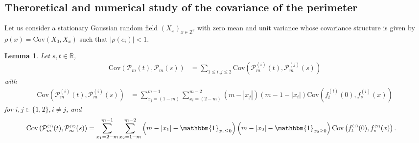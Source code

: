 \documentclass[12pt]{article}
\theoremstyle{Theorem}
\newtheorem{Lemma}[Theorem]{Lemma}
\theoremstyle{definition}
\begin{document}
\subsection{Theroretical and numerical study of the covariance of the perimeter}
Let us consider a stationary Gaussian random field $\left(X_{\scriptscriptstyle x}\right)_{x \in \mathbb{Z}^{2}}$ with zero mean and unit variance whose covariance structure is given by $\rho(x) = \text{Cov}\left(X_{\scriptscriptstyle 0}, X_{\scriptscriptstyle x}\right)$ such that $|\rho(e_i)| < 1$.
\begin{Lemma} 
Let $s, t \in \mathbb{R}$, 
\label{CovLemma}
\begin{align*}
\text{Cov}(\mathcal{P}_{m}(t), \mathcal{P}_{m}(s))  & = \sum_{1\leq i,j\leq 2}\text{Cov}(\mathcal{P}_{m}^{\scriptscriptstyle (i)}(t), \mathcal{P}_{m}^{\scriptscriptstyle (j)}(s)) 
\end{align*} 
with 
\begin{align*}
\text{Cov}\left(\mathcal{P}_{m}^{\scriptscriptstyle (i)}(t),\mathcal{P}_{m}^{\scriptscriptstyle (i)}(s) \right) 
& = \sum_{x_{\scriptscriptstyle j}=\left(1-m\right)}^{m-1}\sum_{x_{\scriptscriptstyle i}=\left(2-m\right)}^{m-2}\left(m -|x_{j}|\right)\left(m - 1- |x_{i}|\right) \text{Cov}\left(f_{t}^{\scriptscriptstyle (i)}(0), f_{s}^{\scriptscriptstyle (i)}(x) \right) 
\end{align*} 
for $i,j \in\{1,2\}, i\neq j$, and 
\begin{align*}
\text{Cov}\left(\mathcal{P}_{m}^{\scriptscriptstyle (1)}(t),\mathcal{P}_{m}^{\scriptscriptstyle (2)}(s) \right) 
& = \sum_{x_1=2-m}^{m-1} \sum_{x_2 = 1-m}^{m-2} \left(m-|x_1| - \mathbbm{1}_{x_{1} \leq 0}\right)\left(m-|x_2|-\mathbbm{1}_{x_{2} \geq 0}\right)\text{Cov}\left(f_{t}^{\scriptscriptstyle (1)}(0), f_{s}^{ \scriptscriptstyle (2)}(x) \right).
\end{align*}
\end{Lemma}
\end{document}
